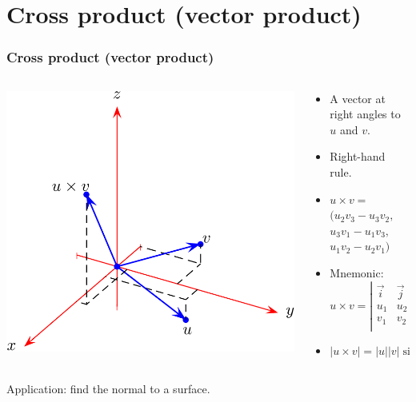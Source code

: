 \documentclass[]{beamer}
\newcommand{\sect}[1]{
\section{#1}
\begin{frame}[fragile]\frametitle{#1}
}
\begin{document}
\sect{Cross product (vector product)}
\begin{columns}
  \begin{column}{0.6\textwidth}
    \includegraphics[scale=0.25]{figures/crossprod.png}
  \end{column}
  \begin{column}{0.4\textwidth}
    \begin{itemize}
    \item A vector at right angles to $u$ and $v$.
\item Right-hand rule.
    \item $u \times v = $\\
      $(u_2v_3 - u_3v_2,$\\$ u_3v_1 - u_1v_3,$\\$ u_1v_2 - u_2v_1)$
      
    \item Mnemonic:
      \[u\times v = \left|\begin{array}{ccc}
      \vec{i} & \vec{j} & \vec{k} \\
      u_1 & u_2 & u_3 \\
      v_1 & v_2 & v_3 \\
      \end{array}\right|\]
    \item $|u\times v| = |u||v|\sin(\theta)$
    \end{itemize}
  \end{column}
\end{columns}
Application:  find the normal to a surface.
\end{frame}
\end{document}
